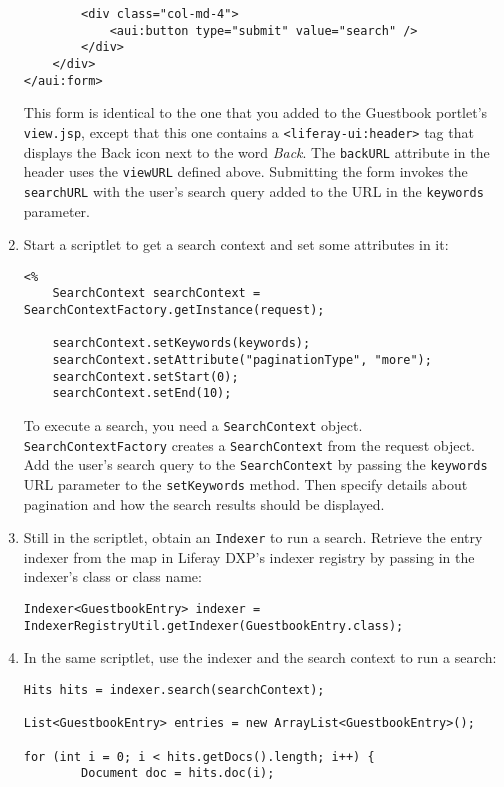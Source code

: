 \begin{enumerate}
\begin{verbatim}
        <div class="col-md-4">
            <aui:button type="submit" value="search" />
        </div>
    </div>
</aui:form>
\end{verbatim}

  This form is identical to the one that you added to the Guestbook
  portlet's \texttt{view.jsp}, except that this one contains a
  \texttt{\textless{}liferay-ui:header\textgreater{}} tag that displays
  the Back icon next to the word \emph{Back}. The \texttt{backURL}
  attribute in the header uses the \texttt{viewURL} defined above.
  Submitting the form invokes the \texttt{searchURL} with the user's
  search query added to the URL in the \texttt{keywords} parameter.
\item
  Start a scriptlet to get a search context and set some attributes in
  it:

\begin{verbatim}
<%
    SearchContext searchContext = SearchContextFactory.getInstance(request);

    searchContext.setKeywords(keywords);
    searchContext.setAttribute("paginationType", "more");
    searchContext.setStart(0);
    searchContext.setEnd(10);
\end{verbatim}

  To execute a search, you need a \texttt{SearchContext} object.
  \texttt{SearchContextFactory} creates a \texttt{SearchContext} from
  the request object. Add the user's search query to the
  \texttt{SearchContext} by passing the \texttt{keywords} URL parameter
  to the \texttt{setKeywords} method. Then specify details about
  pagination and how the search results should be displayed.
\item
  Still in the scriptlet, obtain an \texttt{Indexer} to run a search.
  Retrieve the entry indexer from the map in Liferay DXP's indexer
  registry by passing in the indexer's class or class name:

\begin{verbatim}
Indexer<GuestbookEntry> indexer = IndexerRegistryUtil.getIndexer(GuestbookEntry.class);
\end{verbatim}
\item
  In the same scriptlet, use the indexer and the search context to run a
  search:

\begin{verbatim}
Hits hits = indexer.search(searchContext);

List<GuestbookEntry> entries = new ArrayList<GuestbookEntry>();

for (int i = 0; i < hits.getDocs().length; i++) {
        Document doc = hits.doc(i);


\end{verbatim}
\end{enumerate}
